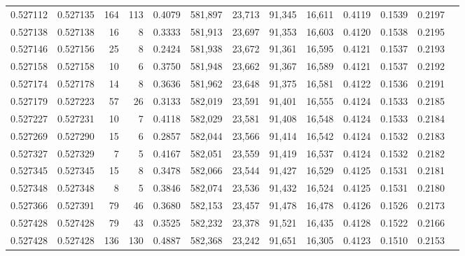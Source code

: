 \begin{tabular}{rrrrrrrrrrrrr}
0.527112 & 0.527135 &   164 &   113 &                                     0.4079 & 581,897 &  23,713 &  91,345 &  16,611 & 0.4119 & 0.1539 & 0.2197 \\
0.527138 & 0.527138 &    16 &     8 &                                     0.3333 & 581,913 &  23,697 &  91,353 &  16,603 & 0.4120 & 0.1538 & 0.2195 \\
0.527146 & 0.527156 &    25 &     8 &                                     0.2424 & 581,938 &  23,672 &  91,361 &  16,595 & 0.4121 & 0.1537 & 0.2193 \\
0.527158 & 0.527158 &    10 &     6 &                                     0.3750 & 581,948 &  23,662 &  91,367 &  16,589 & 0.4121 & 0.1537 & 0.2192 \\
0.527174 & 0.527178 &    14 &     8 &                                     0.3636 & 581,962 &  23,648 &  91,375 &  16,581 & 0.4122 & 0.1536 & 0.2191 \\
0.527179 & 0.527223 &    57 &    26 &                                     0.3133 & 582,019 &  23,591 &  91,401 &  16,555 & 0.4124 & 0.1533 & 0.2185 \\
0.527227 & 0.527231 &    10 &     7 &                                     0.4118 & 582,029 &  23,581 &  91,408 &  16,548 & 0.4124 & 0.1533 & 0.2184 \\
0.527269 & 0.527290 &    15 &     6 &                                     0.2857 & 582,044 &  23,566 &  91,414 &  16,542 & 0.4124 & 0.1532 & 0.2183 \\
0.527327 & 0.527329 &     7 &     5 &                                     0.4167 & 582,051 &  23,559 &  91,419 &  16,537 & 0.4124 & 0.1532 & 0.2182 \\
0.527345 & 0.527345 &    15 &     8 &                                     0.3478 & 582,066 &  23,544 &  91,427 &  16,529 & 0.4125 & 0.1531 & 0.2181 \\
0.527348 & 0.527348 &     8 &     5 &                                     0.3846 & 582,074 &  23,536 &  91,432 &  16,524 & 0.4125 & 0.1531 & 0.2180 \\
0.527366 & 0.527391 &    79 &    46 &                                     0.3680 & 582,153 &  23,457 &  91,478 &  16,478 & 0.4126 & 0.1526 & 0.2173 \\
0.527428 & 0.527428 &    79 &    43 &                                     0.3525 & 582,232 &  23,378 &  91,521 &  16,435 & 0.4128 & 0.1522 & 0.2166 \\
0.527428 & 0.527428 &   136 &   130 &                                     0.4887 & 582,368 &  23,242 &  91,651 &  16,305 & 0.4123 & 0.1510 & 0.2153 \\

\end{tabular}
